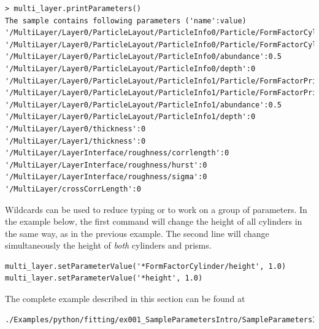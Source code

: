 \begin{lstlisting}[language=shell, style=commandline]
> multi_layer.printParameters()
The sample contains following parameters ('name':value)
'/MultiLayer/Layer0/ParticleLayout/ParticleInfo0/Particle/FormFactorCylinder/height':5
'/MultiLayer/Layer0/ParticleLayout/ParticleInfo0/Particle/FormFactorCylinder/radius':5
'/MultiLayer/Layer0/ParticleLayout/ParticleInfo0/abundance':0.5
'/MultiLayer/Layer0/ParticleLayout/ParticleInfo0/depth':0
'/MultiLayer/Layer0/ParticleLayout/ParticleInfo1/Particle/FormFactorPrism3/length':5
'/MultiLayer/Layer0/ParticleLayout/ParticleInfo1/Particle/FormFactorPrism3/height':5
'/MultiLayer/Layer0/ParticleLayout/ParticleInfo1/abundance':0.5
'/MultiLayer/Layer0/ParticleLayout/ParticleInfo1/depth':0
'/MultiLayer/Layer0/thickness':0
'/MultiLayer/Layer1/thickness':0
'/MultiLayer/LayerInterface/roughness/corrlength':0
'/MultiLayer/LayerInterface/roughness/hurst':0
'/MultiLayer/LayerInterface/roughness/sigma':0
'/MultiLayer/crossCorrLength':0
\end{lstlisting}

Wildcards  can be used to reduce typing or to work on a group
of parameters. In the example below, the first command will change the
height of all cylinders in the same way, as in the previous example. The second line will change simultaneously the height of {\it both} cylinders and prisms.
\begin{lstlisting}[language=shell, style=commandline]
multi_layer.setParameterValue('*FormFactorCylinder/height', 1.0)
multi_layer.setParameterValue('*height', 1.0)
\end{lstlisting}

The complete example described in this section can be found at 
\begin{lstlisting}[language=shell, style=commandline]
./Examples/python/fitting/ex001_SampleParametersIntro/SampleParametersIntro.py
\end{lstlisting}
